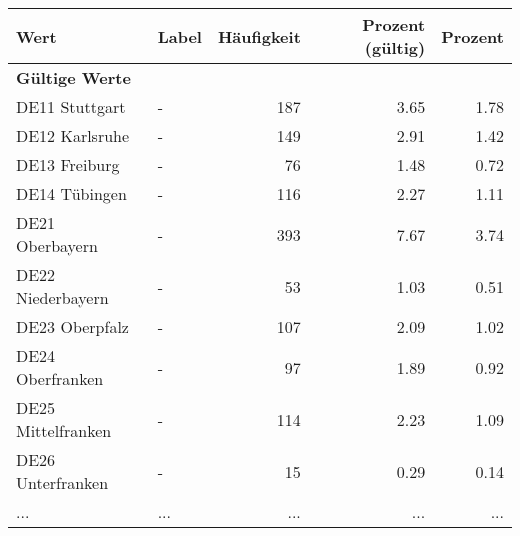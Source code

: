      \begin{longtable}{Xlrrr}
     \toprule
     \textbf{Wert} & \textbf{Label} & \textbf{Häufigkeit} & \textbf{Prozent (gültig)} & \textbf{Prozent} \\
     \endhead
     \midrule
     \multicolumn{5}{l}{\textbf{Gültige Werte}}\\
        \multicolumn{1}{X}{DE11 Stuttgart} & - & \num{187} & \num[round-mode=places,round-precision=2]{3.65} & \num[round-mode=places,round-precision=2]{1.78} \\
        \multicolumn{1}{X}{DE12 Karlsruhe} & - & \num{149} & \num[round-mode=places,round-precision=2]{2.91} & \num[round-mode=places,round-precision=2]{1.42} \\
        \multicolumn{1}{X}{DE13 Freiburg} & - & \num{76} & \num[round-mode=places,round-precision=2]{1.48} & \num[round-mode=places,round-precision=2]{0.72} \\
        \multicolumn{1}{X}{DE14 Tübingen} & - & \num{116} & \num[round-mode=places,round-precision=2]{2.27} & \num[round-mode=places,round-precision=2]{1.11} \\
        \multicolumn{1}{X}{DE21 Oberbayern} & - & \num{393} & \num[round-mode=places,round-precision=2]{7.67} & \num[round-mode=places,round-precision=2]{3.74} \\
        \multicolumn{1}{X}{DE22 Niederbayern} & - & \num{53} & \num[round-mode=places,round-precision=2]{1.03} & \num[round-mode=places,round-precision=2]{0.51} \\
        \multicolumn{1}{X}{DE23 Oberpfalz} & - & \num{107} & \num[round-mode=places,round-precision=2]{2.09} & \num[round-mode=places,round-precision=2]{1.02} \\
        \multicolumn{1}{X}{DE24 Oberfranken} & - & \num{97} & \num[round-mode=places,round-precision=2]{1.89} & \num[round-mode=places,round-precision=2]{0.92} \\
        \multicolumn{1}{X}{DE25 Mittelfranken} & - & \num{114} & \num[round-mode=places,round-precision=2]{2.23} & \num[round-mode=places,round-precision=2]{1.09} \\
        \multicolumn{1}{X}{DE26 Unterfranken} & - & \num{15} & \num[round-mode=places,round-precision=2]{0.29} & \num[round-mode=places,round-precision=2]{0.14} \\
       ... & ... & ... & ... & ... \\

\end{longtable}
